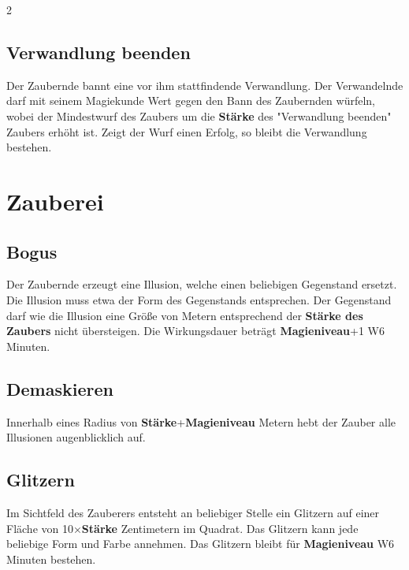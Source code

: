 \begin{multicols*}{2}
\subsection{Verwandlung beenden}

Der Zaubernde bannt eine vor ihm stattfindende Verwandlung. Der Verwandelnde darf mit seinem Magiekunde Wert gegen den Bann des Zaubernden würfeln, wobei der Mindestwurf des Zaubers um die \textbf{Stärke} des "Verwandlung beenden" Zaubers erhöht ist. Zeigt der Wurf einen Erfolg, so bleibt die Verwandlung bestehen.



\section{Zauberei}

\subsection{Bogus}

Der Zaubernde erzeugt eine Illusion, welche einen beliebigen Gegenstand ersetzt. Die Illusion muss etwa der Form des Gegenstands entsprechen. Der Gegenstand darf wie die Illusion eine Größe von Metern entsprechend der \textbf{Stärke des Zaubers} nicht übersteigen. Die Wirkungsdauer beträgt \textbf{Magieniveau}+1 W6 Minuten.



\subsection{Demaskieren}

Innerhalb eines Radius von \textbf{Stärke}+\textbf{Magieniveau} Metern hebt der Zauber alle Illusionen augenblicklich auf.



\subsection{Glitzern}

Im Sichtfeld des Zauberers entsteht an beliebiger Stelle ein Glitzern auf einer Fläche von 10×\textbf{Stärke} Zentimetern im Quadrat. Das Glitzern kann jede beliebige Form und Farbe annehmen. Das Glitzern bleibt für \textbf{Magieniveau} W6 Minuten bestehen.


\end{multicols*}
